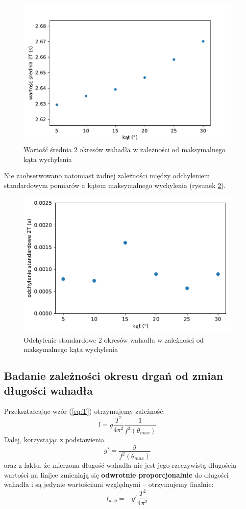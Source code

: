 \documentclass[a4paper]{article}
\begin{document}
\begin{figure}[h!]
\centering
	\includegraphics[scale=0.7]{wykres-1_0.pdf}
\caption{Wartość średnia 2 okresów wahadła w zależności od maksymalnego kąta wychylenia}
\label{fig:mean}
\end{figure}

Nie zaobserwowano natomiast żadnej zależności między odchyleniem standardowym pomiarów 
a kątem maksymalnego wychylenia (rysunek \ref{fig:std}).


\begin{figure}[h!]
\centering
	\includegraphics[scale=0.7]{wykres-2_1.pdf}
\caption{Odchylenie standardowe 2 okresów wahadła w zależności od maksymalnego kąta wychylenia}
\label{fig:std}
\end{figure}


\subsection{Badanie zależności okresu drgań od zmian długości wahadła}
Przekształcając wzór (\ref{eq:T})  otrzymujemy zależność:
\[l = g\frac{T^2}{4\pi^2}\frac{1}{f^2(\theta_{max})} \]
Dalej, korzystając z podstawienia \[g' = \frac{g}{f^2(\theta_{max})} \] oraz z faktu, że mierzona długość wahadła nie jest jego rzeczywistą długością -- wartości na linijce zmieniają się \textbf{odwrotnie proporcjonalnie} do długości wahadła i są jedynie wartościami względnymi -- otrzymujemy finalnie:
\begin{equation} \label{eq:l_wzg}
 l_{wzg} = -g'\frac{T^2}{4\pi^2}
\end{equation}
\end{document}
